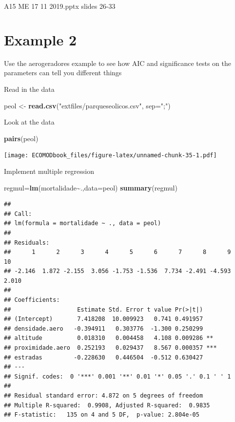 \documentclass[
]{book}
\newenvironment{Shaded}{\begin{snugshade}}{\end{snugshade}}
\newcommand{\AttributeTok}[1]{\textcolor[rgb]{0.13,0.29,0.53}{#1}}
\newcommand{\FunctionTok}[1]{\textcolor[rgb]{0.13,0.29,0.53}{\textbf{#1}}}
\newcommand{\NormalTok}[1]{#1}
\newcommand{\OtherTok}[1]{\textcolor[rgb]{0.56,0.35,0.01}{#1}}
\newcommand{\SpecialCharTok}[1]{\textcolor[rgb]{0.81,0.36,0.00}{\textbf{#1}}}
\newcommand{\StringTok}[1]{\textcolor[rgb]{0.31,0.60,0.02}{#1}}
\begin{document}
A15 ME 17 11 2019.pptx
slides 26-33

\section{Example 2}\label{example-2}

Use the aerogeradores example to see how AIC and significance tests on the parameters can tell you different things

Read in the data

\begin{Shaded}
\begin{Highlighting}[]
\NormalTok{peol }\OtherTok{\textless{}{-}} \FunctionTok{read.csv}\NormalTok{(}\StringTok{"extfiles/parqueseolicos.csv"}\NormalTok{, }\AttributeTok{sep=}\StringTok{";"}\NormalTok{)}
\end{Highlighting}
\end{Shaded}

Look at the data

\begin{Shaded}
\begin{Highlighting}[]
\FunctionTok{pairs}\NormalTok{(peol)}
\end{Highlighting}
\end{Shaded}

\texttt{[image: ECOMODbook\_files/figure-latex/unnamed-chunk-35-1.pdf]}

Implement multiple regression

\begin{Shaded}
\begin{Highlighting}[]
\NormalTok{regmul}\OtherTok{=}\FunctionTok{lm}\NormalTok{(mortalidade}\SpecialCharTok{\textasciitilde{}}\NormalTok{.,}\AttributeTok{data=}\NormalTok{peol)}
\FunctionTok{summary}\NormalTok{(regmul)}
\end{Highlighting}
\end{Shaded}

\begin{verbatim}
## 
## Call:
## lm(formula = mortalidade ~ ., data = peol)
## 
## Residuals:
##      1      2      3      4      5      6      7      8      9     10 
## -2.146  1.872 -2.155  3.056 -1.753 -1.536  7.734 -2.491 -4.593  2.010 
## 
## Coefficients:
##                   Estimate Std. Error t value Pr(>|t|)    
## (Intercept)       7.418208  10.009923   0.741 0.491957    
## densidade.aero   -0.394911   0.303776  -1.300 0.250299    
## altitude          0.018310   0.004458   4.108 0.009286 ** 
## proximidade.aero  0.252193   0.029437   8.567 0.000357 ***
## estradas         -0.228630   0.446504  -0.512 0.630427    
## ---
## Signif. codes:  0 '***' 0.001 '**' 0.01 '*' 0.05 '.' 0.1 ' ' 1
## 
## Residual standard error: 4.872 on 5 degrees of freedom
## Multiple R-squared:  0.9908, Adjusted R-squared:  0.9835 
## F-statistic:   135 on 4 and 5 DF,  p-value: 2.804e-05
\end{verbatim}
\end{document}
